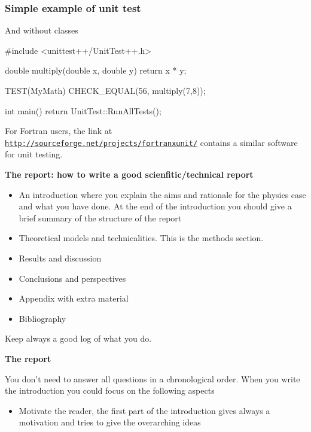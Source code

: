 \documentclass[handout]{beamer}
\newenvironment{block_mdfboxadmon}[1][]{\begin{block}{#1}}{\end{block}}
\begin{document}
\begin{frame}
\frametitle{Simple example of unit test}

\begin{block_mdfboxadmon}[]
And without classes
\begin{print}
#include <unittest++/UnitTest++.h>


double multiply(double x, double y) {
    return x * y;
}

TEST(MyMath) {
    CHECK_EQUAL(56, multiply(7,8));
}

int main()
{
    return UnitTest::RunAllTests();
} 
\end{print}
For Fortran users, the link at \href{{http://sourceforge.net/projects/fortranxunit/}}{\nolinkurl{http://sourceforge.net/projects/fortranxunit/}} contains a similar
software for unit testing.
\end{block_mdfboxadmon}





\noindent\textbf{\large The report: how to write a good scienfitic/technical report}

\begin{block_mdfboxadmon}
\begin{itemize}
 \item An introduction where you explain the aims and rationale for the physics case and  what you have done. At the end of the introduction you should give a brief summary of the structure of the report

 \item Theoretical models and technicalities. This is the methods section.

 \item Results and discussion

 \item Conclusions and perspectives

 \item Appendix with extra material

 \item Bibliography
\end{itemize}

\noindent
Keep always a good log of what you do.
\end{block_mdfboxadmon}




\noindent\textbf{\large The report}

\begin{block_mdfboxadmon}
You don't need to answer all questions in a chronological order.  When you write the introduction you could focus on the following aspects
\begin{itemize}
 \item Motivate the reader, the first part of the introduction gives always a motivation and tries to give the overarching ideas


\end{itemize}
\end{block_mdfboxadmon}
\end{frame}
\end{document}
